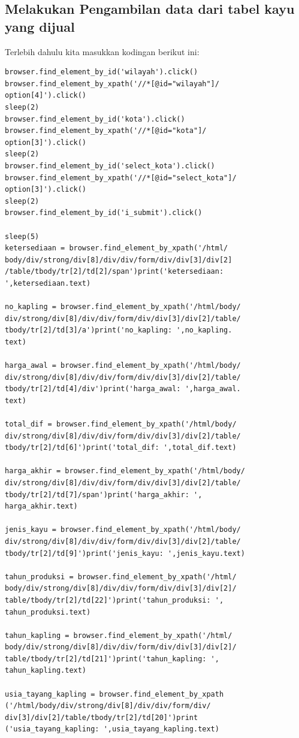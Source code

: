 \newpage
\subsection{Melakukan Pengambilan data dari tabel kayu yang dijual}
Terlebih dahulu kita masukkan kodingan berikut ini:
\begin{verbatim}
browser.find_element_by_id('wilayah').click()
browser.find_element_by_xpath('//*[@id="wilayah"]/
option[4]').click()
sleep(2)
browser.find_element_by_id('kota').click()
browser.find_element_by_xpath('//*[@id="kota"]/
option[3]').click()
sleep(2)
browser.find_element_by_id('select_kota').click()
browser.find_element_by_xpath('//*[@id="select_kota"]/
option[3]').click()
sleep(2)
browser.find_element_by_id('i_submit').click()

sleep(5)
ketersediaan = browser.find_element_by_xpath('/html/
body/div/strong/div[8]/div/div/form/div/div[3]/div[2]
/table/tbody/tr[2]/td[2]/span')print('ketersediaan:
',ketersediaan.text)

no_kapling = browser.find_element_by_xpath('/html/body/
div/strong/div[8]/div/div/form/div/div[3]/div[2]/table/
tbody/tr[2]/td[3]/a')print('no_kapling: ',no_kapling.
text)

harga_awal = browser.find_element_by_xpath('/html/body/
div/strong/div[8]/div/div/form/div/div[3]/div[2]/table/
tbody/tr[2]/td[4]/div')print('harga_awal: ',harga_awal.
text)

total_dif = browser.find_element_by_xpath('/html/body/
div/strong/div[8]/div/div/form/div/div[3]/div[2]/table/
tbody/tr[2]/td[6]')print('total_dif: ',total_dif.text)

harga_akhir = browser.find_element_by_xpath('/html/body/
div/strong/div[8]/div/div/form/div/div[3]/div[2]/table/
tbody/tr[2]/td[7]/span')print('harga_akhir: ',
harga_akhir.text)

jenis_kayu = browser.find_element_by_xpath('/html/body/
div/strong/div[8]/div/div/form/div/div[3]/div[2]/table/
tbody/tr[2]/td[9]')print('jenis_kayu: ',jenis_kayu.text)

tahun_produksi = browser.find_element_by_xpath('/html/
body/div/strong/div[8]/div/div/form/div/div[3]/div[2]/
table/tbody/tr[2]/td[22]')print('tahun_produksi: ',
tahun_produksi.text)

tahun_kapling = browser.find_element_by_xpath('/html/
body/div/strong/div[8]/div/div/form/div/div[3]/div[2]/
table/tbody/tr[2]/td[21]')print('tahun_kapling: ',
tahun_kapling.text)

usia_tayang_kapling = browser.find_element_by_xpath
('/html/body/div/strong/div[8]/div/div/form/div/
div[3]/div[2]/table/tbody/tr[2]/td[20]')print
('usia_tayang_kapling: ',usia_tayang_kapling.text)


\end{verbatim}
